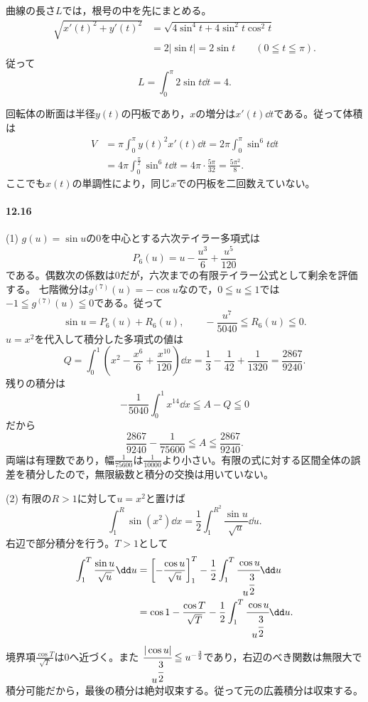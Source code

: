曲線の長さ$L$では，根号の中を先にまとめる。
\[
 \begin{aligned}
 \sqrt{x'(t)^2+y'(t)^2}
 &=\sqrt{4\sin^4t+4\sin^2t\cos^2t}\\
 &=2|\sin t|=2\sin t\qquad(0\leqq t\leqq\pi).
 \end{aligned}
\]
従って
\[
 \boxed{L=\int_0^\pi2\sin t\dd t=4}.
\]

回転体の断面は半径$y(t)$の円板であり，$x$の増分は$x'(t)\dd t$である。従って体積は
\[
 \begin{aligned}
 V&=\pi\int_0^\pi y(t)^2x'(t)\dd t
 =2\pi\int_0^\pi\sin^6t\dd t\\
 &=4\pi\int_0^{\frac\pi2}\sin^6t\dd t
 =4\pi\cdot\frac{5\pi}{32}
 =\boxed{\frac{5\pi^2}{8}}.
 \end{aligned}
\]
ここでも$x(t)$の単調性により，同じ$x$での円板を二回数えていない。

\paragraph{12.16}
(1) $g(u)=\sin u$の$0$を中心とする六次テイラー多項式は
\[
 P_6(u)=u-\frac{u^3}{6}+\frac{u^5}{120}
\]
である。偶数次の係数は$0$だが，六次までの有限テイラー公式として剰余を評価する。
七階微分は$g^{(7)}(u)=-\cos u$なので，$0\leqq u\leqq1$では
$-1\leqq g^{(7)}(u)\leqq0$である。従って
\[
 \sin u=P_6(u)+R_6(u),\qquad
 -\frac{u^7}{5040}\leqq R_6(u)\leqq0.
\]
$u=x^2$を代入して積分した多項式の値は
\[
 Q=\int_0^1\left(x^2-\frac{x^6}{6}+\frac{x^{10}}{120}\right)\dd x
 =\frac13-\frac1{42}+\frac1{1320}
 =\frac{2867}{9240}.
\]
残りの積分は
\[
 -\frac1{5040}\int_0^1x^{14}\dd x
 \leqq A-Q\leqq0
\]
だから
\[
 \boxed{\frac{2867}{9240}-\frac1{75600}
 \leqq A\leqq\frac{2867}{9240}}.
\]
両端は有理数であり，幅$\frac1{75600}$は$\frac1{10000}$より小さい。有限の式に対する区間全体の誤差を積分したので，無限級数と積分の交換は用いていない。

(2) 有限の$R>1$に対して$u=x^2$と置けば
\[
 \int_1^R\sin(x^2)\dd x
 =\frac12\int_1^{R^2}\frac{\sin u}{\sqrt u}\dd u.
\]
右辺で部分積分を行う。$T>1$として
\[
 \begin{aligned}
 \int_1^T\frac{\sin u}{\sqrt u}\dd u
 &=\left[-\frac{\cos u}{\sqrt u}\right]_1^T
   -\frac12\int_1^T\cfrac{\cos u}{u^{\cfrac32}}\dd u\\
 &=\cos1-\frac{\cos T}{\sqrt T}
   -\frac12\int_1^T\cfrac{\cos u}{u^{\cfrac32}}\dd u.
 \end{aligned}
\]
境界項$\frac{\cos T}{\sqrt T}$は$0$へ近づく。また
$\cfrac{|\cos u|}{u^{\cfrac32}}\leqq u^{-\frac32}$であり，右辺のべき関数は無限大で積分可能だから，最後の積分は絶対収束する。従って元の広義積分は収束する。

